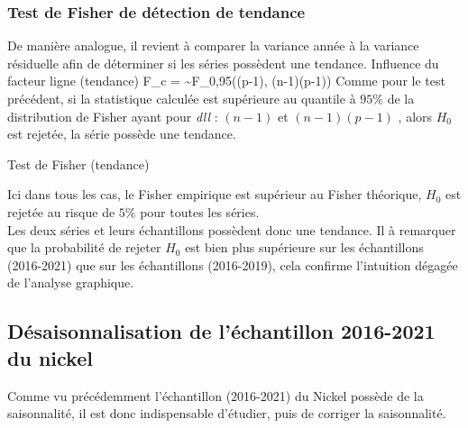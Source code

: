 \subsubsection*{Test de Fisher de détection de tendance}
De manière analogue, il revient à comparer la variance année à la variance résiduelle afin de déterminer si les séries possèdent une tendance.
    {Influence du facteur ligne (tendance)}
    {F_{c} =  \sim F_{0,95}((p-1), (n-1)(p-1))}
Comme pour le test précédent, si la statistique calculée est supérieure au quantile à $ 95\% $ 
de la distribution de Fisher ayant pour \textit{dll} : $(n-1)$ et $(n-1)(p-1)$ , alors $ H_{0} $ est rejetée, la série possède une tendance.
\begin{table}[H]
    \centering
    \caption{Test de Fisher (tendance)}
    \sffamily
    
\end{table}
Ici dans tous les cas, le Fisher empirique est supérieur au Fisher théorique, $H_{0}$ est rejetée
au risque de $ 5\% $ pour toutes les séries. \\[11pt]
Les deux séries et leurs échantillons possèdent donc une tendance. Il à remarquer que la probabilité de rejeter 
$H_{0}$ est bien plus supérieure sur les échantillons (2016-2021) que sur les échantillons (2016-2019),
cela confirme l'intuition dégagée de l'analyse graphique.

\subsection{Désaisonnalisation de l'échantillon 2016-2021 du nickel}
Comme vu précédemment l'échantillon (2016-2021) du Nickel possède de la saisonnalité, il est donc indispensable d'étudier, puis de corriger la saisonnalité. 
